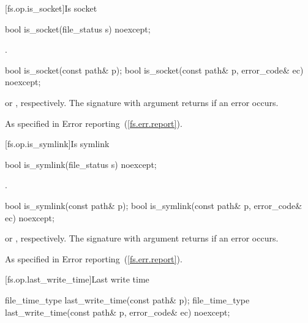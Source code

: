 [fs.op.is_socket]{Is socket}

\begin{itemdecl}
bool is_socket(file_status s) noexcept;
\end{itemdecl}

\begin{itemdescr}
\pnum
\returns {}.
\end{itemdescr}

\begin{itemdecl}
bool is_socket(const path& p);
bool is_socket(const path& p, error_code& ec) noexcept;
\end{itemdecl}

\begin{itemdescr}
\pnum
\returns {} or
  , respectively. The signature with argument
   returns  if an error occurs.

\pnum
\throws As specified in Error reporting~(\ref{fs.err.report}).
\end{itemdescr}


[fs.op.is_symlink]{Is symlink}

\begin{itemdecl}
bool is_symlink(file_status s) noexcept;
\end{itemdecl}

\begin{itemdescr}
\pnum
\returns {}.
\end{itemdescr}

\begin{itemdecl}
bool is_symlink(const path& p);
bool is_symlink(const path& p, error_code& ec) noexcept;
\end{itemdecl}

\begin{itemdescr}
\pnum
\returns {} or ,
  respectively. The signature with argument  returns 
  if an error occurs.

\pnum
\throws As specified in Error reporting~(\ref{fs.err.report}).
\end{itemdescr}


[fs.op.last_write_time]{Last write time}

\begin{itemdecl}
file_time_type last_write_time(const path& p);
file_time_type last_write_time(const path& p, error_code& ec) noexcept;
\end{itemdecl}

